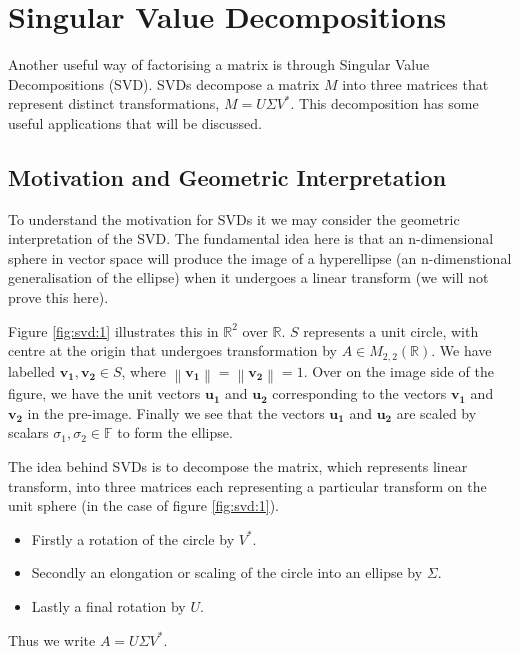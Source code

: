 \documentclass[12pt,reqno,twoside,titlepage]{article}
\theoremstyle{definition}
\newcommand{\norm}[1]{\left\lVert#1\right\rVert}
\begin{document}
\section{Singular Value Decompositions}
\label{sec:svd}
Another useful way of factorising a matrix is through Singular Value Decompositions (SVD).
SVDs decompose a matrix $M$ into three matrices that represent distinct transformations, $M = U \Sigma V^*$.
This decomposition has some useful applications that will be discussed.

\subsection{Motivation and Geometric Interpretation}
\label{sec:svd:1}
To understand the motivation for SVDs it we may consider the geometric interpretation of the SVD.
The fundamental idea here is that an n-dimensional sphere in vector space will produce the image of a hyperellipse (an n-dimenstional generalisation of the ellipse) when it undergoes a linear transform (we will not prove this here).

Figure \ref{fig:svd:1} illustrates this in $\mathbb{R}^2$ over $\mathbb{R}$.
$S$ represents a unit circle, with centre at the origin that undergoes transformation by $A \in M_{2, 2}(\mathbb{R})$.
We have labelled $\mathbf{v_1}, \mathbf{v_2} \in S$, where $\norm{\mathbf{v_1}} = \norm{\mathbf{v_2}} = 1$.
Over on the image side of the figure, we have the unit vectors $\mathbf{u_1}$ and $\mathbf{u_2}$ corresponding to the vectors $\mathbf{v_1}$ and $\mathbf{v_2}$ in the pre-image.
Finally we see that the vectors $\mathbf{u_1}$ and $\mathbf{u_2}$ are scaled by scalars $\sigma_1, \sigma_2 \in \mathbb{F}$ to form the ellipse.


The idea behind SVDs is to decompose the matrix, which  represents linear transform, into three matrices each representing a particular transform on the unit sphere (in the case of figure \ref{fig:svd:1}).

\begin{itemize}
\item Firstly a rotation of the circle by $V^*$.
\item Secondly an elongation or scaling of the circle into an ellipse by $\Sigma$.
\item Lastly a final rotation by $U$.
\end{itemize}

Thus we write $A = U \Sigma V^*$.
\end{document}
